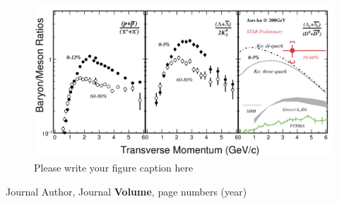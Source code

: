 \documentclass{webofc}
\begin{document}
\begin{figure}[ht]
\centering
\includegraphics[width=.90\textwidth]{Plots/LambdacSTARAuAu}
\caption{Please write your figure caption here}
\label{recombinationBaryons}     
\end{figure}


\begin{thebibliography}{}
Journal Author, Journal \textbf{Volume}, page numbers (year)
\end{thebibliography}
\end{document}
